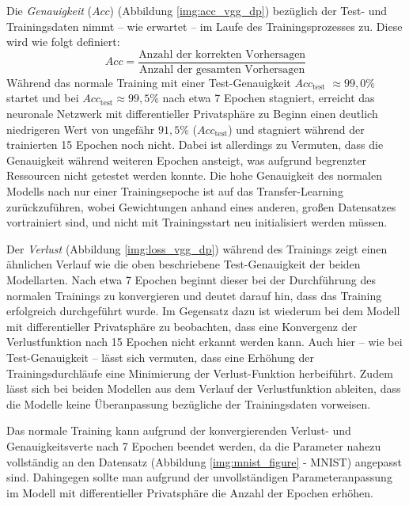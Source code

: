 Die \textit{Genauigkeit} (\(Acc\)) (Abbildung \ref{img:acc_vgg_dp}) bezüglich der Test- und Trainingsdaten nimmt -- wie erwartet -- im Laufe des Trainingsprozesses zu. 
Diese wird wie folgt definiert: 
\begin{equation}
	Acc = \frac{\text{Anzahl der korrekten Vorhersagen}}{\text{Anzahl der gesamten Vorhersagen}}
\end{equation}
Während das \glqq normale Training\grqq{} mit einer Test-Genauigkeit \(Acc_{\text{test}}\) $\approx99{,}0\%$ startet und bei  \(Acc_{\text{test}}\)$\approx 99{,}5\%$ nach etwa 7 Epochen stagniert, erreicht das \glqq neuronale Netzwerk mit differentieller Privatsphäre\grqq{} zu Beginn einen deutlich niedrigeren Wert von ungefähr $91{,}5\%$ (\(Acc_{\text{test}}\)) und stagniert während der trainierten 15 Epochen noch nicht. Dabei ist allerdings zu Vermuten, dass die Genauigkeit während weiteren Epochen ansteigt, was aufgrund begrenzter Ressourcen nicht getestet werden konnte. Die hohe Genauigkeit des \glqq normalen\grqq{} Modells nach nur einer Trainingsepoche ist auf das Transfer-Learning zurückzuführen, wobei Gewichtungen anhand eines anderen, großen Datensatzes vortrainiert sind, und nicht mit Trainingsstart neu initialisiert werden müssen. 

Der \textit{Verlust} (Abbildung \ref{img:loss_vgg_dp}) während des Trainings zeigt einen ähnlichen Verlauf wie die oben beschriebene Test-Genauigkeit der beiden Modellarten. Nach etwa 7 Epochen beginnt dieser bei der Durchführung des \glqq normalen Trainings\grqq{} zu konvergieren und deutet darauf hin, dass das Training erfolgreich durchgeführt wurde. Im Gegensatz dazu ist wiederum bei dem \glqq Modell mit differentieller Privatsphäre\grqq{} zu beobachten, dass eine Konvergenz der Verlustfunktion nach 15 Epochen nicht erkannt werden kann. Auch hier -- wie bei Test-Genauigkeit -- lässt sich vermuten, dass eine Erhöhung der Trainingsdurchläufe eine Minimierung der Verlust-Funktion herbeiführt.  Zudem lässt sich bei beiden Modellen aus dem Verlauf der Verlustfunktion ableiten, dass die Modelle keine Überanpassung bezügliche der Trainingsdaten vorweisen. 

Das \glqq normale Training\grqq{} kann aufgrund der konvergierenden Verlust- und Genauigkeitsverte nach 7 Epochen beendet werden, da die Parameter nahezu vollständig an den Datensatz (Abbildung \ref{img:mnist_figure} - MNIST) angepasst sind. Dahingegen sollte man aufgrund der unvollständigen Parameteranpassung im Modell mit differentieller Privatsphäre die Anzahl der Epochen  erhöhen.


